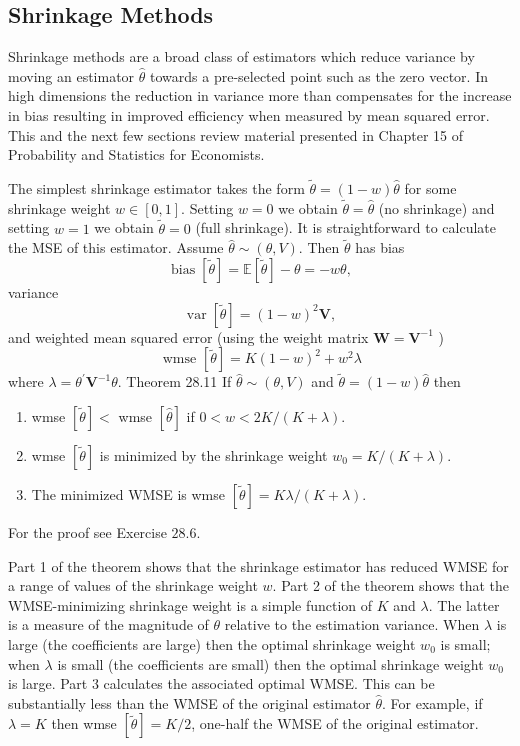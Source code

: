 \documentclass[10pt]{article}
\begin{document}
\subsection{Shrinkage Methods}
Shrinkage methods are a broad class of estimators which reduce variance by moving an estimator $\hat{\theta}$ towards a pre-selected point such as the zero vector. In high dimensions the reduction in variance more than compensates for the increase in bias resulting in improved efficiency when measured by mean squared error. This and the next few sections review material presented in Chapter 15 of Probability and Statistics for Economists.

The simplest shrinkage estimator takes the form $\widetilde{\theta}=(1-w) \widehat{\theta}$ for some shrinkage weight $w \in[0,1]$. Setting $w=0$ we obtain $\widetilde{\theta}=\widehat{\theta}$ (no shrinkage) and setting $w=1$ we obtain $\widetilde{\theta}=0$ (full shrinkage). It is straightforward to calculate the MSE of this estimator. Assume $\widehat{\theta} \sim(\theta, V)$. Then $\widetilde{\theta}$ has bias
$$
\operatorname{bias}[\widetilde{\theta}]=\mathbb{E}[\widetilde{\theta}]-\theta=-w \theta,
$$
variance
$$
\operatorname{var}[\widetilde{\theta}]=(1-w)^{2} \boldsymbol{V},
$$
and weighted mean squared error (using the weight matrix $\boldsymbol{W}=\boldsymbol{V}^{-1}$ )
$$
\text { wmse }[\widetilde{\theta}]=K(1-w)^{2}+w^{2} \lambda
$$
where $\lambda=\theta^{\prime} \boldsymbol{V}^{-1} \theta$. Theorem 28.11 If $\widehat{\theta} \sim(\theta, V)$ and $\widetilde{\theta}=(1-w) \widehat{\theta}$ then

\begin{enumerate}
  \item wmse $[\widetilde{\theta}]<$ wmse $[\hat{\theta}]$ if $0<w<2 K /(K+\lambda)$.

  \item wmse $[\widetilde{\theta}]$ is minimized by the shrinkage weight $w_{0}=K /(K+\lambda)$.

  \item The minimized WMSE is wmse $[\widetilde{\theta}]=K \lambda /(K+\lambda)$.

\end{enumerate}
For the proof see Exercise $28.6$.

Part 1 of the theorem shows that the shrinkage estimator has reduced WMSE for a range of values of the shrinkage weight $w$. Part 2 of the theorem shows that the WMSE-minimizing shrinkage weight is a simple function of $K$ and $\lambda$. The latter is a measure of the magnitude of $\theta$ relative to the estimation variance. When $\lambda$ is large (the coefficients are large) then the optimal shrinkage weight $w_{0}$ is small; when $\lambda$ is small (the coefficients are small) then the optimal shrinkage weight $w_{0}$ is large. Part 3 calculates the associated optimal WMSE. This can be substantially less than the WMSE of the original estimator $\widehat{\theta}$. For example, if $\lambda=K$ then wmse $[\widetilde{\theta}]=K / 2$, one-half the WMSE of the original estimator.
\end{document}
